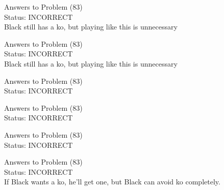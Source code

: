\documentclass[11pt]{article}
\begin{document}
\begin{minipage}[t]{0.5\textwidth}
  {\centering
  
  Answers to Problem (83)\\
  Status: INCORRECT\\
  Black still has a ko, but playing like this is unnecessary\\
  }
\end{minipage}
\begin{minipage}[t]{0.5\textwidth}
  {\centering
  
  Answers to Problem (83)\\
  Status: INCORRECT\\
  Black still has a ko, but playing like this is unnecessary\\
  }
\end{minipage}
\begin{minipage}[t]{0.5\textwidth}
  {\centering
  
  Answers to Problem (83)\\
  Status: INCORRECT\\
  
  }
\end{minipage}
\begin{minipage}[t]{0.5\textwidth}
  {\centering
  
  Answers to Problem (83)\\
  Status: INCORRECT\\
  
  }
\end{minipage}
\begin{minipage}[t]{0.5\textwidth}
  {\centering
  
  Answers to Problem (83)\\
  Status: INCORRECT\\
  
  }
\end{minipage}
\begin{minipage}[t]{0.5\textwidth}
  {\centering
  
  Answers to Problem (83)\\
  Status: INCORRECT\\
  If Black wants a ko, he'll get one, but Black can avoid ko completely.\\
  }
\end{minipage}
\end{document}
